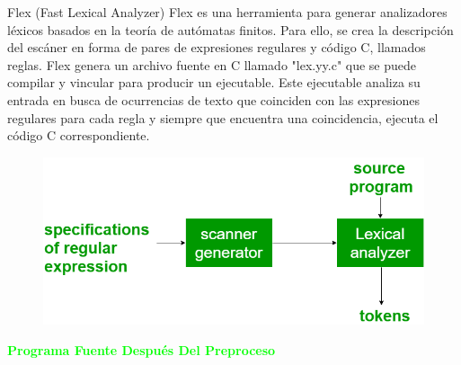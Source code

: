 \documentclass[compress]{beamer}
\begin{document}
\begin{frame}{Flex (Fast Lexical Analyzer)}
    \justifying
    Flex es una herramienta para generar analizadores léxicos basados en la teoría de autómatas finitos. Para ello, se crea la descripción del escáner en forma de pares de expresiones regulares y código C, llamados reglas. Flex genera un archivo fuente en C llamado "lex.yy.c" que se puede compilar y vincular para producir un ejecutable. Este ejecutable analiza su entrada en busca de ocurrencias de texto que coinciden con las expresiones regulares para cada regla y siempre que encuentra una coincidencia, ejecuta el código C correspondiente.

    \begin{figure}
        \centering
        \includegraphics[scale=0.3]{images/flex.png}
    \end{figure}
    
\end{frame}

\begin{frame} 
\centering
\huge
    \textcolor{lime}{\textbf{Programa Fuente Después Del Preproceso}}
\end{frame}


\end{document}
